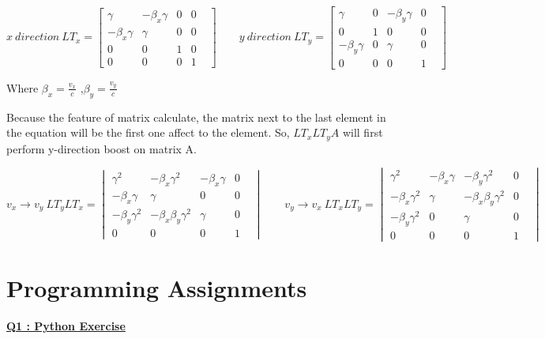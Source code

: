 \documentclass{article}
\begin{document}
\begin{equation}
x \ direction \ LT_x=
\begin{bmatrix}
\gamma& -\beta_x\gamma& 0& 0 \\ -\beta_x\gamma& \gamma& 0& 0 \\ 0& 0& 1& 0& \\ 0& 0& 0& 1
\end{bmatrix}
\qquad
y \ direction \ LT_y=
\begin{bmatrix}
\gamma& 0& -\beta_y\gamma& 0 \\ 0& 1& 0& 0 \\ -\beta_y\gamma& 0& \gamma& 0& \\ 0& 0& 0& 1
\end{bmatrix}
\label{eq:lt}
\end{equation}

Where $\beta_x= \frac{v_x}{c}$ ,$\beta_y= \frac{v_y}{c}$

Because the feature of matrix calculate, the matrix next to the last element in the equation will be the first one affect to the element. So, $LT_xLT_yA$ will first perform y-direction boost on matrix A.

\begin{equation*}
v_x \rightarrow v_y \ 
LT_yLT_x=
\begin{vmatrix}
\gamma^2& -\beta_x\gamma^2& -\beta_x\gamma& 0 \\
-\beta_x\gamma& \gamma& 0& 0 \\
-\beta_y\gamma^2& -\beta_x\beta_y\gamma^2& \gamma& 0& \\
0& 0& 0& 1
\end{vmatrix}
\qquad
v_y \rightarrow v_x \ 
LT_xLT_y=
\begin{vmatrix}
\gamma^2& -\beta_x\gamma& -\beta_y\gamma^2& 0 \\
-\beta_x\gamma^2& \gamma& -\beta_x\beta_y\gamma^2& 0 \\
-\beta_y\gamma^2& 0& \gamma& 0& \\
0& 0& 0& 1
\end{vmatrix}
\end{equation*}


\section{Programming Assignments}
\underline{\textbf{Q1 : Python Exercise}}\\
\end{document}
